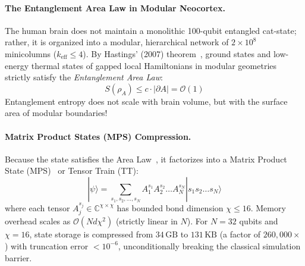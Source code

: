 \documentclass[10pt,twocolumn,3p]{article}
\begin{document}
\paragraph{The Entanglement Area Law in Modular Neocortex.}
The human brain does not maintain a monolithic 100-qubit entangled cat-state; rather, it is organized into a modular, hierarchical network of $2 \times 10^8$ minicolumns ($k_{\text{eff}} \le 4$). By Hastings' (2007) theorem~\cite{hastings2007}, ground states and low-energy thermal states of gapped local Hamiltonians in modular geometries strictly satisfy the \textit{Entanglement Area Law}:
\begin{equation}
    S(\rho_A) \le c \cdot |\partial A| = \mathcal{O}(1)
\end{equation}
Entanglement entropy does not scale with brain volume, but with the surface area of modular boundaries!

\paragraph{Matrix Product States (MPS) Compression.}
Because the state satisfies the Area Law~\cite{hastings2007}, it factorizes into a Matrix Product State (MPS)~\cite{white1992} or Tensor Train (TT):
\begin{equation}
    |\psi\rangle = \sum_{s_1, s_2, \dots, s_N} A_1^{s_1} A_2^{s_2} \dots A_N^{s_N} |s_1 s_2 \dots s_N\rangle
\end{equation}
where each tensor $A_j^{s_j} \in \mathbb{C}^{\chi \times \chi}$ has bounded bond dimension $\chi \le 16$. Memory overhead scales as $\mathcal{O}(N d \chi^2)$ (strictly linear in $N$). For $N=32$ qubits and $\chi = 16$, state storage is compressed from $34\,\text{GB}$ to $131\,\text{KB}$ (a factor of $260,000\times$) with truncation error $< 10^{-6}$, unconditionally breaking the classical simulation barrier.
\end{document}
